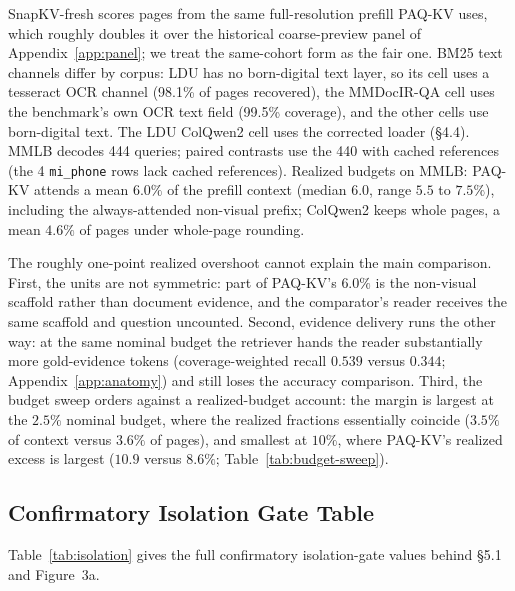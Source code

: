 \documentclass[letterpaper]{article} %
\newcommand{\paqc}{\textsc{PAQ-KV}}
\begin{document}
SnapKV-fresh scores pages from the same full-resolution prefill \paqc{}
uses, which roughly doubles it over the historical coarse-preview panel of
Appendix~\ref{app:panel}; we treat the same-cohort form as the fair one.
BM25 text channels differ by corpus: LDU has no born-digital text
layer, so its cell uses a tesseract OCR channel (98.1\% of pages recovered),
the MMDocIR-QA cell uses the benchmark's own OCR text field (99.5\%
coverage), and the other cells use born-digital text. The LDU
ColQwen2 cell uses the corrected loader (\S4.4).
MMLB decodes 444 queries; paired contrasts use the 440 with
cached references (the 4 \texttt{mi\_phone} rows lack cached references).
Realized budgets on MMLB: \paqc{} attends a mean $6.0\%$ of the
prefill context (median $6.0$, range $5.5$ to $7.5\%$), including the
always-attended non-visual prefix; ColQwen2 keeps whole pages, a mean
$4.6\%$ of pages under whole-page rounding.

The roughly one-point realized overshoot cannot explain the main comparison.
First, the units are not symmetric: part of \paqc{}'s $6.0\%$ is the
non-visual scaffold rather than document evidence, and the comparator's
reader receives the same scaffold and question uncounted. Second, evidence
delivery runs the other way: at the same nominal budget the retriever hands
the reader substantially more gold-evidence tokens (coverage-weighted recall
$0.539$ versus $0.344$; Appendix~\ref{app:anatomy}) and still loses the
accuracy comparison. Third, the budget sweep orders against a
realized-budget account: the margin is largest at the $2.5\%$ nominal
budget, where the realized fractions essentially coincide ($3.5\%$ of
context versus $3.6\%$ of pages), and smallest at $10\%$, where \paqc{}'s
realized excess is largest ($10.9$ versus $8.6\%$;
Table~\ref{tab:budget-sweep}).

\subsection{Confirmatory Isolation Gate Table}\label{app:isolation-table}

Table~\ref{tab:isolation} gives the full confirmatory isolation-gate values
behind \S5.1 and Figure~3a.

\begin{table}[t]
\centering\small

\caption{Confirmatory below-page isolation at $b{=}5\%$ on all \isoKVNComplete{} pinned queries (accuracy; \paqc{} as the fresh arm; post-fix code; document-cluster paired bootstrap; contrast rows report $\Delta$ with 95\% CIs). The two-comparator bar was frozen and committed before the run; the per-cell contrasts are the pre-registered primary, the pooled column is secondary.}
\label{tab:isolation}
\end{table}
\end{document}
